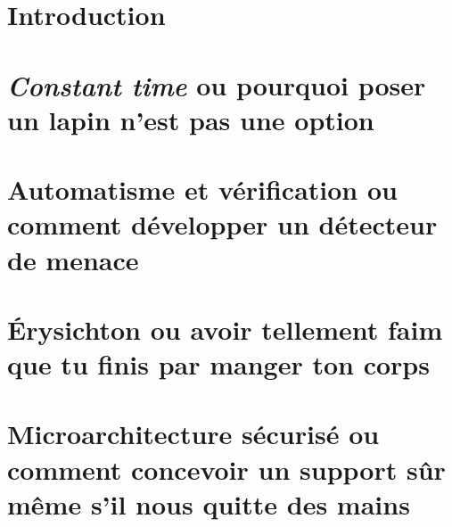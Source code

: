 \documentclass{backend}
\begin{document}
\frontmatter%
\maketitle
\thispagestyle{empty}



\justifying



\cleardoublepage
\tableofcontents*

\part{Introduction}




\mainmatter%
\part{\textit{Constant time} ou pourquoi poser un lapin n'est pas une option}




\part{Automatisme et vérification ou comment développer un détecteur de menace}




\part{Érysichton ou avoir tellement faim que tu finis par manger ton corps}




\part{Microarchitecture sécurisé ou comment concevoir un support sûr même s'il nous quitte des mains}
\end{document}
